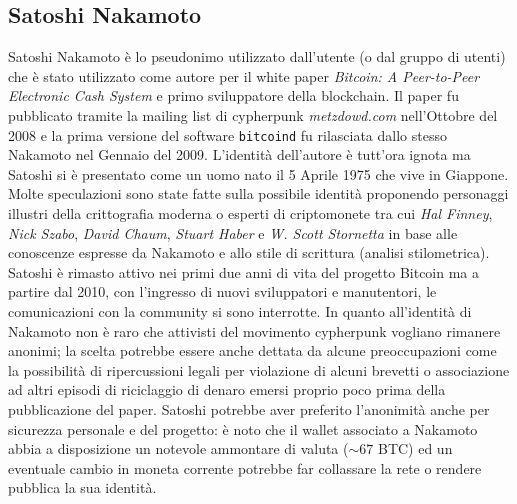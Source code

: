 \appendix
\begin{appendices}
    \chapter{Satoshi Nakamoto}\label{app:satoshi}
    Satoshi Nakamoto è lo pseudonimo utilizzato dall'utente (o dal gruppo di utenti) che è stato utilizzato come autore per il white paper \textit{Bitcoin: A Peer-to-Peer Electronic Cash System}\cite{bitcoinwhite} e primo sviluppatore della blockchain.\newline
    Il paper fu pubblicato tramite la mailing list di cypherpunk \textit{metzdowd.com} nell'Ottobre del 2008 e la prima versione del software \texttt{bitcoind} fu rilasciata dallo stesso Nakamoto nel Gennaio del 2009.\newline
    L'identità dell'autore è tutt'ora ignota ma Satoshi si è presentato come un uomo nato il 5 Aprile 1975 che vive in Giappone. Molte speculazioni sono state fatte sulla possibile identità proponendo personaggi illustri della crittografia moderna o esperti di criptomonete tra cui \textit{Hal Finney}, \textit{Nick Szabo}, \textit{David Chaum}, \textit{Stuart Haber} e \textit{W. Scott Stornetta} in base alle conoscenze espresse da Nakamoto e allo stile di scrittura (analisi stilometrica).\newline
    Satoshi è rimasto attivo nei primi due anni di vita del progetto Bitcoin ma a partire dal 2010, con l'ingresso di nuovi sviluppatori e manutentori, le comunicazioni con la community si sono interrotte.\newline
    In quanto all'identità di Nakamoto non è raro che attivisti del movimento cypherpunk vogliano rimanere anonimi; la scelta potrebbe essere anche dettata da alcune preoccupazioni come la possibilità di ripercussioni legali per violazione di alcuni brevetti o associazione ad altri episodi di riciclaggio di denaro emersi proprio poco prima della pubblicazione del paper.\newline
    Satoshi potrebbe aver preferito l'anonimità anche per sicurezza personale e del progetto: è noto che il wallet associato a Nakamoto abbia a disposizione un notevole ammontare di valuta ($\sim67$ BTC) ed un eventuale cambio in moneta corrente potrebbe far collassare la rete o rendere pubblica la sua identità.
\end{appendices}

